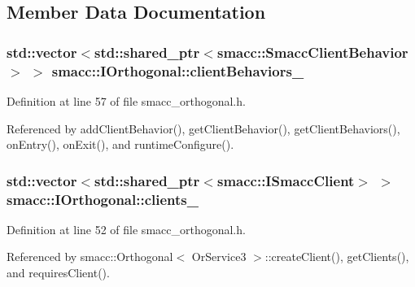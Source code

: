 \subsection{Member Data Documentation}
\subsubsection[{\texorpdfstring{client\+Behaviors\+\_\+}{clientBehaviors_}}]{\setlength{\rightskip}{0pt plus 5cm}std\+::vector$<$std\+::shared\+\_\+ptr$<${\bf smacc\+::\+Smacc\+Client\+Behavior}$>$ $>$ smacc\+::\+I\+Orthogonal\+::client\+Behaviors\+\_\+\hspace{0.3cm}{\ttfamily [private]}}\hypertarget{classsmacc_1_1IOrthogonal_a8e3a85158f85978f8cc01cca7b1d4091}{}\label{classsmacc_1_1IOrthogonal_a8e3a85158f85978f8cc01cca7b1d4091}


Definition at line 57 of file smacc\+\_\+orthogonal.\+h.



Referenced by add\+Client\+Behavior(), get\+Client\+Behavior(), get\+Client\+Behaviors(), on\+Entry(), on\+Exit(), and runtime\+Configure().

\subsubsection[{\texorpdfstring{clients\+\_\+}{clients_}}]{\setlength{\rightskip}{0pt plus 5cm}std\+::vector$<$std\+::shared\+\_\+ptr$<${\bf smacc\+::\+I\+Smacc\+Client}$>$ $>$ smacc\+::\+I\+Orthogonal\+::clients\+\_\+\hspace{0.3cm}{\ttfamily [protected]}}\hypertarget{classsmacc_1_1IOrthogonal_ad3e5fb55db8c40ff178b22c92c9c9cd3}{}\label{classsmacc_1_1IOrthogonal_ad3e5fb55db8c40ff178b22c92c9c9cd3}


Definition at line 52 of file smacc\+\_\+orthogonal.\+h.



Referenced by smacc\+::\+Orthogonal$<$ Or\+Service3 $>$\+::create\+Client(), get\+Clients(), and requires\+Client().

